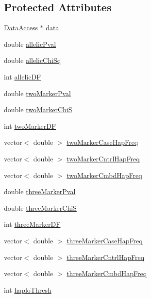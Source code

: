 \subsection*{Protected Attributes}
\begin{DoxyCompactItemize}
\item 
\hyperlink{classDataAccess}{DataAccess} $\ast$ \hyperlink{classHaploStats_aae230c13a34d75fe7e07ab7ae75b2c6d}{data}
\item 
double \hyperlink{classHaploStats_ac19e1b8dcc610e73969faad69b27ccc6}{allelicPval}
\item 
double \hyperlink{classHaploStats_a4fe152dc428bff18ec9d04254834eff1}{allelicChiSq}
\item 
int \hyperlink{classHaploStats_a839271fb722730e8b45127525c471fe6}{allelicDF}
\item 
double \hyperlink{classHaploStats_ae385ebf05af0fa4d0199f4ffa8fd6c74}{twoMarkerPval}
\item 
double \hyperlink{classHaploStats_ae09deb6ca71b310c0c8362b0c92bd116}{twoMarkerChiS}
\item 
int \hyperlink{classHaploStats_a9cfc39f1d2348301cad42b3a4b600229}{twoMarkerDF}
\item 
vector$<$ double $>$ \hyperlink{classHaploStats_ac65cb68586d5102e6b771b5d2cca24eb}{twoMarkerCaseHapFreq}
\item 
vector$<$ double $>$ \hyperlink{classHaploStats_a68d73b06d601fa5809b051f8458a2a23}{twoMarkerCntrlHapFreq}
\item 
vector$<$ double $>$ \hyperlink{classHaploStats_a0a4928ebe077029a82a13fcdb10910c7}{twoMarkerCmbdHapFreq}
\item 
double \hyperlink{classHaploStats_aaaff3d8ec32e831c25296fca296b3f25}{threeMarkerPval}
\item 
double \hyperlink{classHaploStats_a7146d3781769f3c30c353ebc6552bf8c}{threeMarkerChiS}
\item 
int \hyperlink{classHaploStats_a88b45a1784a3af46f1727325f1520300}{threeMarkerDF}
\item 
vector$<$ double $>$ \hyperlink{classHaploStats_ab9fe88dff2fea23a2d76ab656f5a22ec}{threeMarkerCaseHapFreq}
\item 
vector$<$ double $>$ \hyperlink{classHaploStats_aeabf9d28af93060be4d3b7a06a36684c}{threeMarkerCntrlHapFreq}
\item 
vector$<$ double $>$ \hyperlink{classHaploStats_ae4aa675ce11d88b43564c7ca54cc9f3f}{threeMarkerCmbdHapFreq}
\item 
int \hyperlink{classHaploStats_a856613cafb08e96a0fc267ab3a5482fc}{haploThresh}
\end{DoxyCompactItemize}


